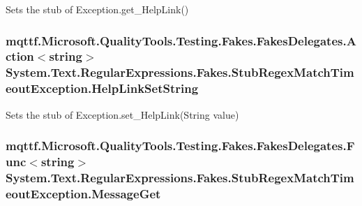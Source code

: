 Sets the stub of Exception.\-get\-\_\-\-Help\-Link()

\hypertarget{class_system_1_1_text_1_1_regular_expressions_1_1_fakes_1_1_stub_regex_match_timeout_exception_a97b73d965a2e6382a98321396ca95e1d}{
\subsubsection[{Help\-Link\-Set\-String}]{\setlength{\rightskip}{0pt plus 5cm}mqttf.\-Microsoft.\-Quality\-Tools.\-Testing.\-Fakes.\-Fakes\-Delegates.\-Action$<$string$>$ System.\-Text.\-Regular\-Expressions.\-Fakes.\-Stub\-Regex\-Match\-Timeout\-Exception.\-Help\-Link\-Set\-String}}\label{class_system_1_1_text_1_1_regular_expressions_1_1_fakes_1_1_stub_regex_match_timeout_exception_a97b73d965a2e6382a98321396ca95e1d}


Sets the stub of Exception.\-set\-\_\-\-Help\-Link(\-String value)

\hypertarget{class_system_1_1_text_1_1_regular_expressions_1_1_fakes_1_1_stub_regex_match_timeout_exception_a48c5b5cdd80950a913952ed3494176f3}{
\subsubsection[{Message\-Get}]{\setlength{\rightskip}{0pt plus 5cm}mqttf.\-Microsoft.\-Quality\-Tools.\-Testing.\-Fakes.\-Fakes\-Delegates.\-Func$<$string$>$ System.\-Text.\-Regular\-Expressions.\-Fakes.\-Stub\-Regex\-Match\-Timeout\-Exception.\-Message\-Get}}\label{class_system_1_1_text_1_1_regular_expressions_1_1_fakes_1_1_stub_regex_match_timeout_exception_a48c5b5cdd80950a913952ed3494176f3}



